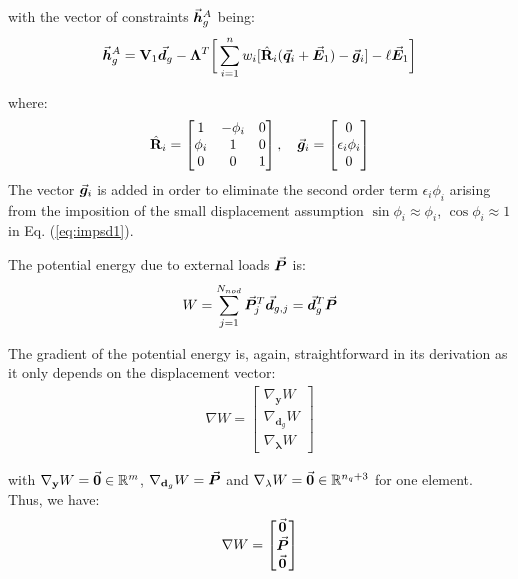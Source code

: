\begin{appendices}
\noindent with the vector of constraints $\vec{\bm{h}}_g^A$ being:
\begin{gather}
	\vec{\bm{h}}^A_g = \mathbf{V}_1\vec{\bm{d}}_g - \mathbf{\Lambda}^T\bigg[\sum_{i=1}^n
	w_i[\hat{\mathbf{R}}_i(\vec{\bm{q}}_i+\vec{\bm{E}}_1) -\vec{\bm{g}}_i] - 
	\ell\vec{\bm{E}}_1\bigg]
\end{gather}

\noindent where:
\begin{gather}
	\hat{\mathbf{R}}_i = \begin{bmatrix}
		1 & -\phi_i & 0\\
		\phi_i & 1 & 0\\
		0 & 0 & 1
	\end{bmatrix},\quad \vec{\bm{g}}_i = \begin{bmatrix}
		0\\ \epsilon_i\phi_i\\ 0
	\end{bmatrix}\nonumber
\end{gather}
\noindent The vector $\vec{\bm{g}}_i$ is added in order to eliminate the second
order term $\epsilon_i\phi_i$ arising from the imposition of the small
displacement assumption $\sin\phi_i \approx \phi_i$, $\cos\phi_i\approx1$ in Eq.
(\ref{eq:impsd1}).

The potential energy due to external loads $\vec{\bm{P}}$ is:
\begin{gather}
	W = \sum_{j=1}^{N_{nod}}\vec{\bm{P}}_j^T\vec{\bm{d}}_{g,j} = 
	\vec{\bm{d}}_g^T\vec{\bm{P}}\nonumber
\end{gather}

\noindent The gradient of the potential energy is, again, straightforward in its
derivation as it only depends on the displacement vector:
\begin{gather}
	\nabla W = \begin{bmatrix}
		\nabla_{\mathbf{y}}W\\ \nabla_{\mathbf{d}_g}W\\ 
		\nabla_{\mathbf{\lambda}}W
	\end{bmatrix}\nonumber
\end{gather}

\noindent with $\nabla_{\mathbf{y}}W = \vec{\bm{0}}\in\mathbb{R}^m$,
$\nabla_{\mathbf{d}_g}W = \vec{\bm{P}}$ and $\nabla_{\mathbf{\lambda}}W =
\vec{\bm{0}}\in\mathbb{R}^{n_q+3}$ for one element. Thus, we have:
\begin{gather}
	\nabla W = \begin{bmatrix}
		\vec{\bm{0}}\\ \vec{\bm{P}}\\ \vec{\bm{0}}	\end{bmatrix}
\end{gather}


\end{appendices}
